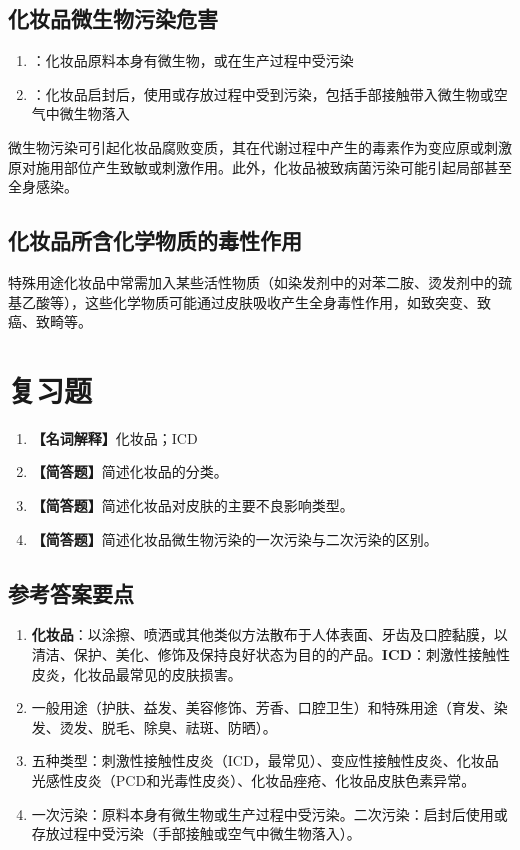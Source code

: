 \subsection{化妆品微生物污染危害}

\begin{enumerate}[leftmargin=*]
    \item {}：化妆品原料本身有微生物，或在生产过程中受污染
    \item {}：化妆品启封后，使用或存放过程中受到污染，包括手部接触带入微生物或空气中微生物落入
\end{enumerate}

微生物污染可引起化妆品腐败变质，其在代谢过程中产生的毒素作为变应原或刺激原对施用部位产生致敏或刺激作用。此外，化妆品被致病菌污染可能引起局部甚至全身感染。

\subsection{化妆品所含化学物质的毒性作用}

特殊用途化妆品中常需加入某些活性物质（如染发剂中的对苯二胺、烫发剂中的巯基乙酸等），这些化学物质可能通过皮肤吸收产生全身毒性作用，如致突变、致癌、致畸等。

\section{复习题}

\begin{enumerate}[leftmargin=*, itemsep=8pt]
    \item \textbf{【名词解释】}化妆品；ICD
    \item \textbf{【简答题】}简述化妆品的分类。
    \item \textbf{【简答题】}简述化妆品对皮肤的主要不良影响类型。
    \item \textbf{【简答题】}简述化妆品微生物污染的一次污染与二次污染的区别。
\end{enumerate}

\subsection*{参考答案要点}

\begin{enumerate}[leftmargin=*, itemsep=5pt]
    \item \textbf{化妆品}：以涂擦、喷洒或其他类似方法散布于人体表面、牙齿及口腔黏膜，以清洁、保护、美化、修饰及保持良好状态为目的的产品。\textbf{ICD}：刺激性接触性皮炎，化妆品最常见的皮肤损害。
    \item 一般用途（护肤、益发、美容修饰、芳香、口腔卫生）和特殊用途（育发、染发、烫发、脱毛、除臭、祛斑、防晒）。
    \item 五种类型：刺激性接触性皮炎（ICD，最常见）、变应性接触性皮炎、化妆品光感性皮炎（PCD和光毒性皮炎）、化妆品痤疮、化妆品皮肤色素异常。
    \item 一次污染：原料本身有微生物或生产过程中受污染。二次污染：启封后使用或存放过程中受污染（手部接触或空气中微生物落入）。
\end{enumerate}

\newpage

\newpage